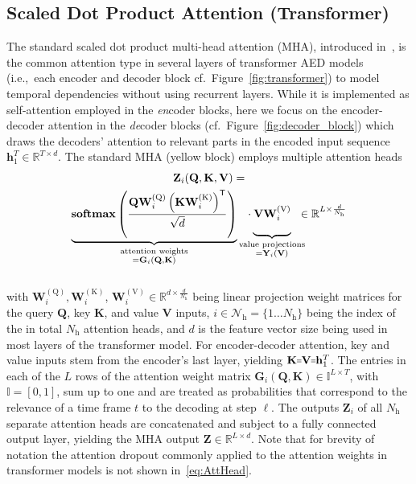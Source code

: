 \documentclass{article}
\newcommand{\VEC}[1]{\mathbf{#1}}          \newcommand{\VECG}[1]{\boldmath{#1}}     \newcommand{\MAT}[1]{\mathbf{#1}}          \newcommand{\MATG}[1]{\boldsymbol{#1}}
\newcommand\shorteq{\rule[.35ex]{4pt}{0.4pt}\llap{\rule[.75ex]{4pt}{0.4pt}}}
\begin{document}
\subsection{Scaled Dot Product Attention (Transformer)}\vspace{-2mm}
The standard scaled dot product multi-head attention (MHA), introduced in~\cite{Vaswani2017}, is the common attention type in several layers of transformer AED models (i.e.,\ each encoder and decoder block cf.\ Figure~\ref{fig:transformer}) to model temporal dependencies without using recurrent layers. While it is implemented as self-attention employed in the \textit{en}coder blocks, here we focus on the encoder-decoder attention in the \textit{de}coder blocks (cf.\ Figure~\ref{fig:decoder_block}) which draws the decoders' attention to relevant parts in the encoded input sequence $\VEC{h}_1^T\!\in\!\mathbb{R}^{T\times d}$. The standard MHA (yellow block) employs multiple attention heads
\vspace{-2mm}\begin{multline}\label{eq:AttHead}
	\mathbf{Z}_i(\MAT{Q},\MAT{K},\MAT{V}) = \\
	\underbrace{\mathbf{softmax}\left(\frac{\MAT{Q}\MAT{W}_i^\mathrm{(Q)}\left(\MAT{K}\MAT{W}_i^\mathrm{(K)}\right)^\mathsf{T}}{\sqrt{d}}\right)}_{\substack{{\text{attention weights}}\\ =\MAT{G}_i(\MAT{Q},\MAT{K})}}\underbrace{\vphantom{ \left(\frac{\left({\MAT{W}^(K)}\right)^T}{\sqrt{d}}\right) }\!\!\!\!\cdot\MAT{V}\MAT{W}_i^\mathrm{(V)}}_{\substack{{\text{value projections}}\\=\MAT{Y}_i(\MAT{V})}}\!\!\!\!\in\mathbb{R}^{L\times\frac{d}{N_\mathrm{h}}}\raisetag{20pt}
\end{multline}\vspace{-2mm}\\
with $\MAT{W}_i^\mathrm{(Q)}, \MAT{W}_i^\mathrm{(K)}$, $\MAT{W}_i^\mathrm{(V)}\!\in\!\mathbb{R}^{d\!\times\! \frac{d}{N_\mathrm{h}}}$ being linear projection weight matrices for the query $\MAT{Q}$, key $\MAT{K}$, and value $\MAT{V}$ inputs, $i\in\mathcal{N}_\mathrm{h}\!=\!\{1\dots N_\mathrm{h}\}$ being the index of the in total $N_\mathrm{h}$ attention heads, and $d$ is the feature vector size being used in most layers of the transformer model. For encoder-decoder attention, key and value inputs stem from the encoder's last layer, yielding $\MAT{K}\shorteq\MAT{V}\shorteq\MAT{h}_1^T$. The entries in each of the $L$ rows of the attention weight matrix $\MAT{G}_i(\MAT{Q},\MAT{K})\!\in\!\mathbb{I}^{L\times T}$, with $\mathbb{I}\!=\![0,1]$, sum up to one and are treated as probabilities that correspond to the relevance of a time frame $t$ to the decoding at step $\ell$. The outputs $\VEC{Z}_i$ of all $N_\mathrm{h}$ separate attention heads are concatenated and subject to a fully connected output layer, yielding the MHA output $\MAT{Z}\in\mathbb{R}^{L\times d}$. Note that for brevity of notation the attention dropout commonly applied to the attention weights in transformer models is not shown in~\eqref{eq:AttHead}. 
 \vspace{-1mm}
\end{document}
